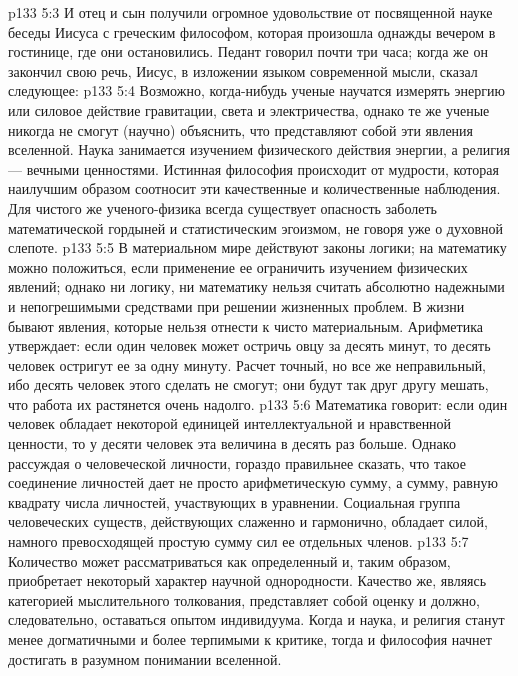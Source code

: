 \vs p133 5:3 И отец и сын получили огромное удовольствие от посвященной науке беседы Иисуса с греческим философом, которая произошла однажды вечером в гостинице, где они остановились. Педант говорил почти три часа; когда же он закончил свою речь, Иисус, в изложении языком современной мысли, сказал следующее:
\vs p133 5:4 \pc Возможно, когда\hyp{}нибудь ученые научатся измерять энергию или силовое действие гравитации, света и электричества, однако те же ученые никогда не смогут (научно) объяснить, что представляют собой эти явления вселенной. Наука занимается изучением физического действия энергии, а религия --- вечными ценностями. Истинная философия происходит от мудрости, которая наилучшим образом соотносит эти качественные и количественные наблюдения. Для чистого же ученого\hyp{}физика всегда существует опасность заболеть математической гордыней и статистическим эгоизмом, не говоря уже о духовной слепоте.
\vs p133 5:5 В материальном мире действуют законы логики; на математику можно положиться, если применение ее ограничить изучением физических явлений; однако ни логику, ни математику нельзя считать абсолютно надежными и непогрешимыми средствами при решении жизненных проблем. В жизни бывают явления, которые нельзя отнести к чисто материальным. Арифметика утверждает: если один человек может остричь овцу за десять минут, то десять человек остригут ее за одну минуту. Расчет точный, но все же неправильный, ибо десять человек этого сделать не смогут; они будут так друг другу мешать, что работа их растянется очень надолго.
\vs p133 5:6 Математика говорит: если один человек обладает некоторой единицей интеллектуальной и нравственной ценности, то у десяти человек эта величина в десять раз больше. Однако рассуждая о человеческой личности, гораздо правильнее сказать, что такое соединение личностей дает не просто арифметическую сумму, а сумму, равную квадрату числа личностей, участвующих в уравнении. Социальная группа человеческих существ, действующих слаженно и гармонично, обладает силой, намного превосходящей простую сумму сил ее отдельных членов.
\vs p133 5:7 Количество может рассматриваться как определенный  и, таким образом, приобретает некоторый характер научной однородности. Качество же, являясь категорией мыслительного толкования, представляет собой оценку  и должно, следовательно, оставаться опытом индивидуума. Когда и наука, и религия станут менее догматичными и более терпимыми к критике, тогда и философия начнет достигать  в разумном понимании вселенной.
